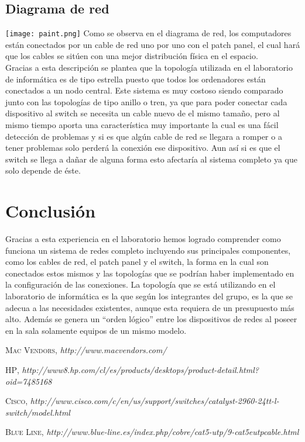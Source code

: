 \documentclass{udpreport}
\begin{document}
	\section{Diagrama de red}
		\texttt{[image: paint.png]}
		Como se observa en el diagrama de red, los computadores están conectados por un cable de red uno por uno con el patch                 panel, el cual hará que los cables se sitúen con una mejor distribución física en el espacio.\\
                Gracias a esta descripción se plantea que la topología utilizada en el laboratorio de informática es de tipo estrella                 puesto que todos los ordenadores están conectados a un nodo central. Este sistema es muy costoso siendo comparado                     junto con las topologías de tipo anillo o tren, ya que para poder conectar cada dispositivo al switch se necesita un                  cable nuevo de el mismo tamaño, pero al mismo tiempo aporta una característica muy importante la cual es una fácil                    detección de problemas y si es que algún cable de red se llegara a romper o a tener problemas solo perderá la conexión                 ese dispositivo. Aun así si es que el switch se llega a dañar de alguna forma esto afectaría al sistema completo ya                   que solo depende de éste.

\chapter{Conclusión}
                Gracias a esta experiencia en el laboratorio hemos logrado comprender como funciona un sistema de redes completo 
                incluyendo sus principales componentes, como los cables de red, el patch panel y el switch, la forma en la cual son 
                conectados estos mismos y las topologías que se podrían haber implementado en la configuración de las conexiones. La 
                topología que se está utilizando en el laboratorio de informática es la que según los integrantes del grupo, es la que
                se adecua a las necesidades existentes, aunque esta requiera de un presupuesto más alto. Además se genera un ``orden lógico'' entre los dispositivos de redes al poseer en la sala solamente equipos de un mismo modelo.
\begin{thebibliography}{x}

 \textsc{Mac Vendors},
\textit{http://www.macvendors.com/}

 \textsc{HP},
\textit{http://www8.hp.com/cl/es/products/desktops/product-detail.html?oid=7485168}

 \textsc{Cisco},
\textit{http://www.cisco.com/c/en/us/support/switches/catalyst-2960-24tt-l-switch/model.html}

 \textsc{Blue Line},
\textit{http://www.blue-line.es/index.php/cobre/cat5-utp/9-cat5eutpcable.html}

\end{thebibliography}
\end{document}
